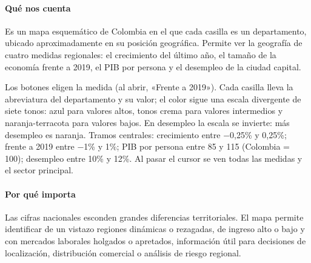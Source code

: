 \paragraph{Qué nos cuenta}
Es un mapa esquemático de Colombia en el que cada casilla es un departamento, ubicado aproximadamente en su posición geográfica. Permite ver la geografía de cuatro medidas regionales: el crecimiento del último año, el tamaño de la economía frente a 2019, el PIB por persona y el desempleo de la ciudad capital.

\begin{leer}
Los botones eligen la medida (al abrir, «Frente a 2019»). Cada casilla lleva la abreviatura del departamento y su valor; el color sigue una escala divergente de siete tonos: azul para valores altos, tonos crema para valores intermedios y naranja-terracota para valores bajos. En desempleo la escala se invierte: más desempleo es naranja. Tramos centrales: crecimiento entre −0,25\% y 0,25\%; frente a 2019 entre −1\% y 1\%; PIB por persona entre 85 y 115 (Colombia = 100); desempleo entre 10\% y 12\%. Al pasar el cursor se ven todas las medidas y el sector principal.
\end{leer}

\paragraph{Por qué importa}
Las cifras nacionales esconden grandes diferencias territoriales. El mapa permite identificar de un vistazo regiones dinámicas o rezagadas, de ingreso alto o bajo y con mercados laborales holgados o apretados, información útil para decisiones de localización, distribución comercial o análisis de riesgo regional.

